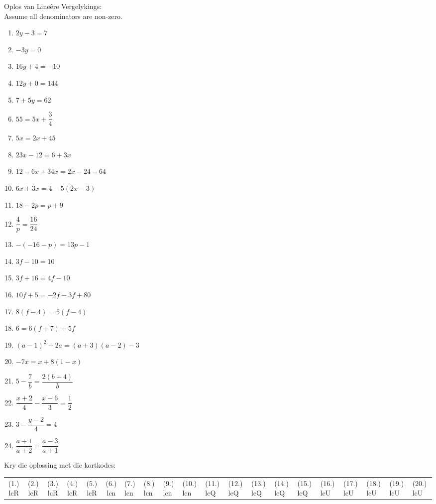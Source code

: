 \begin{exercises}{}
{
Oplos van Lineêre Vergelykings: \\
Assume all denominators are non-zero.
\begin{multicols}{2}
\begin{enumerate}[noitemsep, label=\textbf{\arabic*}. ] 
\item   $2y-3=7$
\item   $-3y=0$        
\item   $16y+4=-10$        
\item   $12y+0=144$
\item   $7+5y=62$   \vspace{6pt}     
\item  $55=5x+\dfrac{3}{4}$ \vspace{6pt}
\item   $5x=2x+45$        
\item  $23x-12=6+3x$
\item   $12-6x+34x=2x-24-64$
\item   $6x+3x=4-5(2x-3)$
\item   $18-2p=p+9$   \vspace{6pt}
\item   $\dfrac{4}{p}=\dfrac{16}{24}$
\item   $-(-16-p)=13p-1$
\item   $3f-10=10$
\item   $3f+16=4f-10$
\item   $10f+5=-2f-3f+80$
\item   $8(f-4)=5(f-4)$
\item  $6=6(f+7)+5f$      
\item $(a-1)^{2} - 2a = (a+3)(a-2) - 3$
\item $-7x = x+8(1-x)$ \vspace{6pt}
\item $5-\dfrac{7}{b} = \dfrac{2(b+4)}{b}$\vspace{6pt}
\item $\dfrac{x+2}{4} - \dfrac{x-6}{3} = \dfrac{1}{2}$\vspace{6pt}
\item $ 3 - \dfrac{y-2}{4} = 4$\vspace{6pt}
\item $ \dfrac{a+1}{a+2} = \dfrac{a-3}{a+1}$
  
\end{enumerate}
\end{multicols}
\par {} Kry die oplossing met die kortkodes:
\par \begin{tabular}[h]{cccccc}
(1.) lcR  &  (2.) lcR  &  (3.) lcR  &  (4.) lcR  &  (5.) lcR  &  (6.) lcn  &  (7.) lcn  &  (8.) lcn  &  (9.) lcn  &  (10.) lcn  &  (11.) lcQ  &  (12.) lcQ  &  (13.) lcQ  &  (14.) lcQ  &  (15.) lcQ  &  (16.) lcU  &  (17.) lcU  &  (18.) lcU  &  (19.) lcU  &  (20.) lcU  & \end{tabular}
}
\end{exercises}

